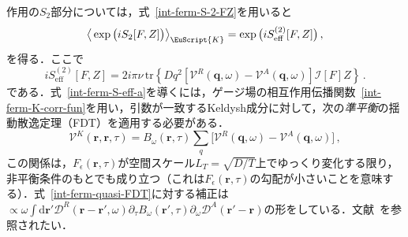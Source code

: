 \documentclass[a4paper,11pt]{ltjsarticle}
\def\tr{\mathrm{tr}}
\def\d{\mathrm{d}}
\def\qo{(\mathbf{q},\omega)}
\begin{document}
作用の$S_2$部分については，式~\eqref{int-ferm-S-2-FZ}を用いると
\begin{equation}
\big\langle\exp\big(iS_{2}[F,Z]\big)\big\rangle_{\EuScript{K}}=
\exp\big(iS^{(2)}_{\mathrm{eff}}[F,Z]\big)\,,
\end{equation}
を得る．ここで
\begin{equation}\label{int-ferm-S-eff-a}
iS^{(2)}_{\mathrm{eff}}[F,Z]=2i\pi\nu\,\tr\left\{Dq^{2}[\mathcal{V}^{R}\qo-
\mathcal{V}^{A}\qo]\mathcal{I}[F]Z\right\}\,.
\end{equation}
である．式~\eqref{int-ferm-S-eff-a}を導くには，ゲージ場の相互作用伝播関数~\eqref{int-ferm-K-corr-fun}を用い，引数が一致するKeldysh成分に対して，次の\textit{準平衡}の揺動散逸定理（FDT）を適用する必要がある．
\begin{equation}\label{int-ferm-quasi-FDT}
\mathcal{V}^{K}(\mathbf{r},\mathbf{r},\tau)=B_{\omega}(\mathbf{r},\tau)
\sum_{q}\big[\mathcal{V}^{R}\qo-\mathcal{V}^{A}\qo\big]\,,
\end{equation}
この関係は，$F_{\epsilon}(\mathbf{r},\tau)$が空間スケール$L_{T}=\sqrt{D/T}$上でゆっくり変化する限り，非平衡条件のもとでも成り立つ（これは$F_{\epsilon}(\mathbf{r},\tau)$の勾配が小さいことを意味する）．式~\eqref{int-ferm-quasi-FDT}に対する補正は$\propto\omega\int\d\mathbf{r}'\mathcal{D}^{R}(\mathbf{r}-\mathbf{r}',\omega)
\partial_{\tau}B_{\omega}(\mathbf{r}',\tau)\partial_{\omega}
\mathcal{D}^{A}(\mathbf{r}'-\mathbf{r})$の形をしている．文献~\cite{Kamenev:1999zza}を参照されたい．
\end{document}
